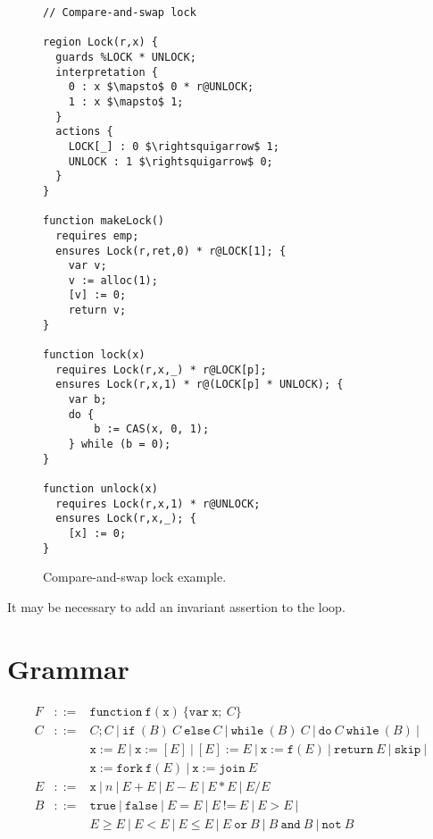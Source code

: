 \documentclass[a4paper]{article}
\newcommand{\pfunction}[4]{\mathtt{function} \ #1(#2) \ \{ \mathtt{var} \ #3 ; \ #4 \}}
\newcommand{\psequence}[2]{#1 ; #2}
\newcommand{\pifelse}[3]{\mathtt{if} \ (#1) \ #2 \ \mathtt{else} \ #3}
\newcommand{\pwhile}[2]{\mathtt{while} \ (#1) \ #2}
\newcommand{\pdowhile}[2]{\mathtt{do} \ #1 \ \mathtt{while} \ (#2)}
\newcommand{\plassign}[2]{#1 := #2}
\newcommand{\passign}[2]{[#1] := #2}
\newcommand{\pderef}[2]{#1 := [#2]}
\newcommand{\pfuncall}[3]{#1 := #2(#3)}
\newcommand{\preturn}[1]{\mathtt{return} \ #1}
\newcommand{\pskip}[0]{\mathtt{skip}}
\newcommand{\pfork}[3]{#1 := \mathtt{fork} \ #2(#3)}
\newcommand{\pjoin}[2]{#1 := \mathtt{join} \ #2}
\begin{document}
\begin{figure}
\begin{center}
\begin{lstlisting}[language=caper,mathescape,columns=flexible]
// Compare-and-swap lock

region Lock(r,x) {
  guards %LOCK * UNLOCK;
  interpretation {
    0 : x $\mapsto$ 0 * r@UNLOCK;
    1 : x $\mapsto$ 1;
  }
  actions {
    LOCK[_] : 0 $\rightsquigarrow$ 1;
    UNLOCK : 1 $\rightsquigarrow$ 0;
  }
}

function makeLock()
  requires emp;
  ensures Lock(r,ret,0) * r@LOCK[1]; {
    var v;
    v := alloc(1);
    [v] := 0;
    return v;
}

function lock(x)
  requires Lock(r,x,_) * r@LOCK[p];
  ensures Lock(r,x,1) * r@(LOCK[p] * UNLOCK); {
    var b;
    do {
        b := CAS(x, 0, 1);
    } while (b = 0);
}

function unlock(x)
  requires Lock(r,x,1) * r@UNLOCK;
  ensures Lock(r,x,_); {
    [x] := 0;
}
\end{lstlisting}
\end{center}
\caption{Compare-and-swap lock example.}
\label{fig:caslock}
\end{figure}

It may be necessary to add an invariant assertion to the loop.

\section{Grammar}

\[
\begin{array}{rcl}
  F & ::= & \pfunction{\mathtt{f}}{\mathtt{x}}{\mathtt{x}}{C} \\
  C & ::= & \psequence{C}{C} \ | \ \pifelse{B}{C}{C} \ | \ \pwhile{B}{C} \ | \ \pdowhile{C}{B} \ | \ \\
  & & \plassign{\mathtt{x}}{E} \ | \ \pderef{\mathtt{x}}{E} \ | \ \passign{E}{E} \ | \ \pfuncall{\mathtt{x}}{\mathtt{f}}{E} \ | \ \preturn{E} \ | \ \pskip \ | \ \\
  & & \pfork{\mathtt{x}}{\mathtt{f}}{E} \ | \ \pjoin{\mathtt{x}}{E} \\
  E & ::= & \mathtt{x} \ | \ n \ | \ E + E \ | \ E - E \ | \ E * E \ | \ E / E\\
  B & ::= & \mathtt{true} \ | \ \mathtt{false} \ | \ E = E \ | \ E \ \text{!=} \ E \ | \ E > E \ | \ \\
  & & E \ge E \ | \ E < E \ | \ E \le E \ | \ E \ \mathtt{or} \ B \ | \ B \ \mathtt{and} \ B \ | \ \mathtt{not} \ B
\end{array}
\]
\end{document}
